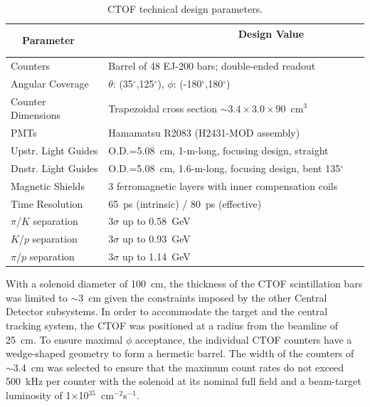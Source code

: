 \documentclass[3p,times,twocolumn]{elsarticle}
\begin{document}
\begin{table}[ht]
\begin{center}
\begin{tabular} {ll} \hline
~~Parameter~~ &~~~~~~~~~~~~~~~~~~~~~~ Design Value ~~~~~~~~~~\\ \hline
Counters             & Barrel of 48 EJ-200 bars; double-ended readout \\
Angular Coverage     & $\theta$: (35$^\circ$,125$^\circ$), $\phi$: (-180$^\circ$,180$^\circ$) \\
Counter Dimensions   & Trapezoidal cross section $\sim 3.4 \times 3.0 \times 90$~cm$^3$ \\
PMTs                 & Hamamatsu R2083 (H2431-MOD assembly)    \\
Upstr. Light Guides  & O.D.=5.08~cm, 1-m-long, focusing design, straight \\
Dnstr. Light Guides  & O.D.=5.08~cm, 1.6-m-long, focusing design, bent 135$^\circ$ \\
Magnetic Shields     & 3 ferromagnetic layers with inner compensation coils \\
Time Resolution    & 65~ps (intrinsic) / 80~ps (effective) \\
$\pi$/$K$ separation & 3$\sigma$ up to 0.58~GeV \\ 
$K$/$p$ separation   & 3$\sigma$ up to 0.93~GeV \\ 
$\pi$/$p$ separation & 3$\sigma$ up to 1.14~GeV \\ \hline
\end{tabular}
\end{center}
\caption{CTOF technical design parameters.}
\label{spec-table}
\end{table}

With a solenoid diameter of 100~cm, the thickness of the CTOF scintillation bars was limited to $\sim$3~cm
given the constraints imposed by the other Central Detector subsystems. In order to accommodate the target
and the central tracking system, the CTOF was positioned at a radius from the beamline of 25~cm. To ensure
maximal $\phi$ acceptance, the individual CTOF counters have a wedge-shaped geometry to form a hermetic
barrel. The width of the counters of $\sim$3.4~cm was selected to ensure that the maximum count rates do
not exceed 500~kHz per counter with the solenoid at its nominal full field and a beam-target luminosity of
1$\times$10$^{35}$~cm$^{-2}$s$^{-1}$.
\end{document}
